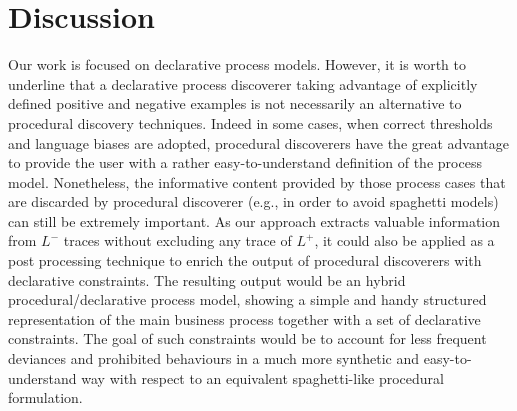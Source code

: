 
\section{Discussion}
\label{sec:discuss}
Our work is focused on declarative process models. However, it is worth to underline that a declarative process discoverer taking advantage of explicitly defined positive and negative examples is not necessarily an alternative to procedural discovery techniques. 
Indeed in some cases, when correct thresholds and language biases are adopted, procedural discoverers have the great advantage to provide the user with a rather easy-to-understand definition of the process model. Nonetheless, the informative content provided by those process cases that are discarded by procedural discoverer (e.g., in order to avoid spaghetti models) can still be extremely important. 
As our approach extracts valuable information from $L^-$ traces without excluding any trace of $L^+$, it could also be applied as a post processing technique to enrich the output of procedural discoverers with declarative constraints.
The resulting output would be an hybrid procedural/declarative process model, showing a simple and handy structured representation of the main business process together with a set of declarative constraints. The goal of such constraints would be to account for less frequent deviances and prohibited behaviours in a much more synthetic and easy-to-understand way with respect to an equivalent spaghetti-like procedural formulation.

